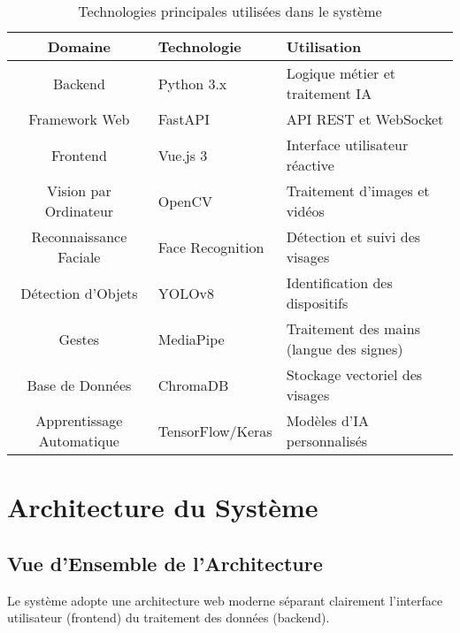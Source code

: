 \documentclass[12pt,a4paper]{article}
\begin{document}
\begin{table}[H]
\centering
\begin{tabular}{|c|p{4cm}|p{6cm}|}
\hline
\rowcolor{lightblue}
\textbf{Domaine} & \textbf{Technologie} & \textbf{Utilisation} \\
\hline
Backend & Python 3.x & Logique métier et traitement IA \\
\hline
Framework Web & FastAPI & API REST et WebSocket \\
\hline
Frontend & Vue.js 3 & Interface utilisateur réactive \\
\hline
Vision par Ordinateur & OpenCV & Traitement d'images et vidéos \\
\hline
Reconnaissance Faciale & Face Recognition & Détection et suivi des visages \\
\hline
Détection d'Objets & YOLOv8 & Identification des dispositifs \\
\hline
Gestes & MediaPipe & Traitement des mains (langue des signes) \\
\hline
Base de Données & ChromaDB & Stockage vectoriel des visages \\
\hline
Apprentissage Automatique & TensorFlow/Keras & Modèles d'IA personnalisés \\
\hline
\end{tabular}
\caption{Technologies principales utilisées dans le système}
\end{table}

\section{Architecture du Système}

\subsection{Vue d'Ensemble de l'Architecture}

Le système adopte une architecture web moderne séparant clairement l'interface utilisateur (frontend) du traitement des données (backend).
\end{document}
